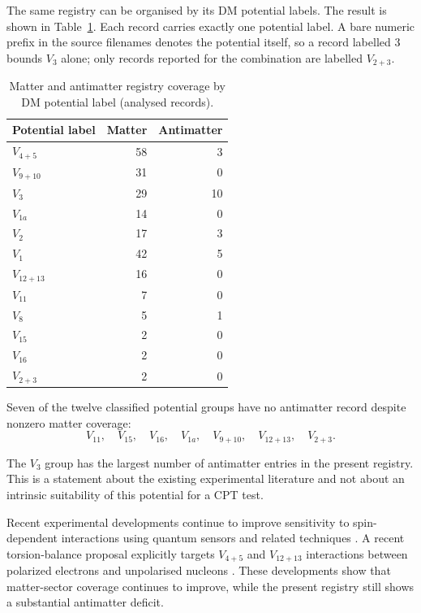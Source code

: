 \documentclass[aps,prd,reprint,superscriptaddress,nofootinbib]{revtex4-2}
\begin{document}
	The same registry can be organised by its DM potential labels. The
	result is shown in Table~\ref{tab:potentialcoverage}. Each record carries exactly one potential label. A bare numeric prefix in the source filenames denotes the potential itself, so a record labelled 3 bounds $V_3$ alone; only records reported for the combination are labelled $V_{2+3}$.
	
	\begin{table}[t]
		\caption{Matter and antimatter registry coverage by DM potential label (analysed records).}
		\label{tab:potentialcoverage}
		\begin{ruledtabular}
			\begin{tabular}{lrr}
				Potential label & Matter & Antimatter\\
				\hline
				$V_{4+5}$ & 58 & 3\\
				$V_{9+10}$ & 31 & 0\\
				$V_3$ & 29 & 10\\
				$V_{1a}$ & 14 & 0\\
				$V_2$ & 17 & 3\\
				$V_1$ & 42 & 5\\
				$V_{12+13}$ & 16 & 0\\
				$V_{11}$ & 7 & 0\\
				$V_8$ & 5 & 1\\
				$V_{15}$ & 2 & 0\\
				$V_{16}$ & 2 & 0\\
				$V_{2+3}$ & 2 & 0
			\end{tabular}
		\end{ruledtabular}
	\end{table}
	
	Seven of the twelve classified potential groups have no antimatter record despite nonzero matter coverage:
	\begin{equation}
		V_{11},\quad
		V_{15},\quad
		V_{16},\quad
		V_{1a},\quad
		V_{9+10},\quad V_{12+13},\quad V_{2+3}.
	\end{equation}
	
	The $V_3$ group has the largest number of antimatter entries in the present registry. This is a statement about the existing experimental
	literature and not about an intrinsic suitability of this potential for
	a CPT test.
	
	Recent experimental developments continue to improve sensitivity to
	spin-dependent interactions using quantum sensors and related
	techniques \cite{Jiao2021,Liang2023,Jiang2025,Cong2025,WuYan2026}.
	A recent torsion-balance proposal explicitly targets $V_{4+5}$ and $V_{12+13}$ interactions between polarized electrons and unpolarised nucleons \cite{Jin2026}. These developments show that matter-sector coverage continues to improve, while the present registry still shows a substantial antimatter deficit.
	
\end{document}
